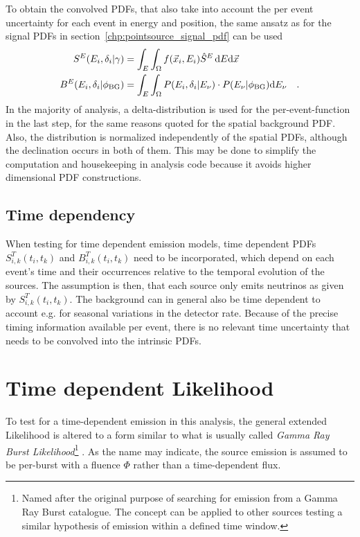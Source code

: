 To obtain the convolved PDFs, that also take into account the per event uncertainty for each event in energy and position, the same ansatz as for the signal PDFs in section~\ref{chp:pointsource_signal_pdf} can be used
\begin{align}
  S^E(E_i, \delta_i|\gamma) &=
    \int_E\int_\Omega f(\vec{x}_i, E_i)\hat{S}^E\,\mathrm{d}E\mathrm{d}\vec{x} \\
  B^E(E_i, \delta_i|\phi_\mathrm{BG}) &=
    \int_E\int_\Omega P(E_i,\delta_i|E_\nu)\cdot P(E_\nu|\phi_\mathrm{BG})
      \mathrm{d}E_\nu
    \quad\text{.}
\end{align}
In the majority of analysis, a delta-distribution is used for the per-event-function in the last step, for the same reasons quoted for the spatial background PDF.
Also, the distribution is normalized independently of the spatial PDFs, although the declination occurs in both of them.
This may be done to simplify the computation and housekeeping in analysis code because it avoids higher dimensional PDF constructions.

\subsection{Time dependency}
When testing for time dependent emission models, time dependent PDFs $S_{i,k}^T(t_i, t_k)$ and $B_{i,k}^T(t_i, t_k)$ need to be incorporated, which depend on each event's time and their occurrences relative to the temporal evolution of the sources.
The assumption is then, that each source only emits neutrinos as given by $S_{i,k}^T(t_i, t_k)$.
The background can in general also be time dependent to account e.g. for seasonal variations in the detector rate.
Because of the precise timing information available per event, there is no relevant time uncertainty that needs to be convolved into the intrinsic PDFs.


\section{Time dependent Likelihood}
  \label{chp:pointsource_tdep_llh}
To test for a time-dependent emission in this analysis, the general extended Likelihood is altered to a form similar to what is usually called \emph{Gamma Ray Burst Likelihood}\footnote{Named after the original purpose of searching for emission from a Gamma Ray Burst catalogue. The concept can be applied to other sources testing a similar hypothesis of emission within a defined time window.} \cite{Aartsen:2017zvw,Aartsen:2014aqy,Aartsen:2017wea}.
As the name may indicate, the source emission is assumed to be per-burst with a fluence $\Phi$ rather than a time-dependent flux.

